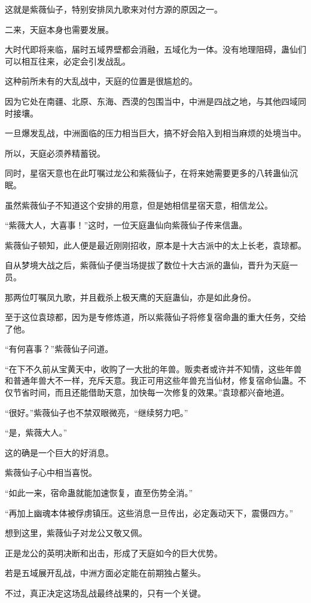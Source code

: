 \begin{this_body}
这就是紫薇仙子，特别安排凤九歌来对付方源的原因之一。

二来，天庭本身也需要发展。

大时代即将来临，届时五域界壁都会消融，五域化为一体。没有地理阻碍，蛊仙们可以相互往来，必定会引发战乱。

这种前所未有的大乱战中，天庭的位置是很尴尬的。

因为它处在南疆、北原、东海、西漠的包围当中，中洲是四战之地，与其他四域同时接壤。

一旦爆发乱战，中洲面临的压力相当巨大，搞不好会陷入到相当麻烦的处境当中。

所以，天庭必须养精蓄锐。

同时，星宿天意也在此叮嘱过龙公和紫薇仙子，在将来她需要更多的八转蛊仙沉眠。

虽然紫薇仙子不知道这个安排的用意，但是她相信星宿天意，相信龙公。

“紫薇大人，大喜事！”这时，一位天庭蛊仙向紫薇仙子传来信蛊。

紫薇仙子顿知，此人便是最近刚刚招收，原本是十大古派中的太上长老，袁琼都。

自从梦境大战之后，紫薇仙子便当场提拔了数位十大古派的蛊仙，晋升为天庭一员。

那两位叮嘱凤九歌，并且截杀上极天鹰的天庭蛊仙，亦是如此身份。

至于这位袁琼都，因为是专修炼道，所以紫薇仙子将修复宿命蛊的重大任务，交给了他。

“有何喜事？”紫薇仙子问道。

“在下不久前从宝黄天中，收购了一大批的年兽。贩卖者或许并不知情，这些年兽和普通年兽大不一样，充斥天意。我正可用这些年兽充当仙材，修复宿命仙蛊。不仅节省时间，而且还能借助天意，加快每一次修复的效果。”袁琼都兴奋地道。

“很好。”紫薇仙子也不禁双眼微亮，“继续努力吧。”

“是，紫薇大人。”

这的确是一个巨大的好消息。

紫薇仙子心中相当喜悦。

“如此一来，宿命蛊就能加速恢复，直至伤势全消。”

“再加上幽魂本体被俘虏镇压。这些消息一旦传出，必定轰动天下，震慑四方。”

想到这里，紫薇仙子对龙公又敬又佩。

正是龙公的英明决断和出击，形成了天庭如今的巨大优势。

若是五域展开乱战，中洲方面必定能在前期独占鳌头。

不过，真正决定这场乱战最终战果的，只有一个关键。


\end{this_body}
